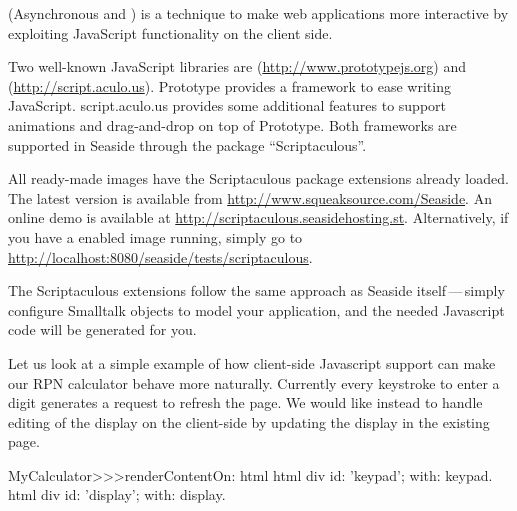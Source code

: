 \documentclass[a4paper,10pt,twoside]{book}
\begin{document}
{{ (Asynchronous  and ) is a technique to make web applications more interactive by exploiting JavaScript functionality on the client side.

Two well-known JavaScript libraries are  (\url{http://www.prototypejs.org}) and  (\url{http://script.aculo.us}).
Prototype provides a framework to ease writing JavaScript.
script.aculo.us provides some additional features to support animations and drag-and-drop on top of Prototype.
Both frameworks are supported in Seaside through the package ``Scriptaculous''.

All ready-made images have the Scriptaculous package extensions already loaded.
The latest version is available from \url{http://www.squeaksource.com/Seaside}.
An online demo is available at \url{http://scriptaculous.seasidehosting.st}.
Alternatively, if you have a enabled image running, simply go to \url{http://localhost:8080/seaside/tests/scriptaculous}.

The Scriptaculous extensions follow the same approach as Seaside itself\,---\,simply configure Smalltalk objects to model your application, and the needed Javascript code will be generated for you.

Let us look at a simple example of how client-side Javascript support can make our RPN calculator behave more naturally.
Currently every keystroke to enter a digit generates a request to refresh the page.
We would like instead to handle editing of the display on the client-side by updating the display in the existing page.


\begin{code}{}
MyCalculator>>>renderContentOn: html
	html div id: 'keypad'; with: keypad.
	html div id: 'display'; with: display.	
\end{code}


}}
\end{document}
